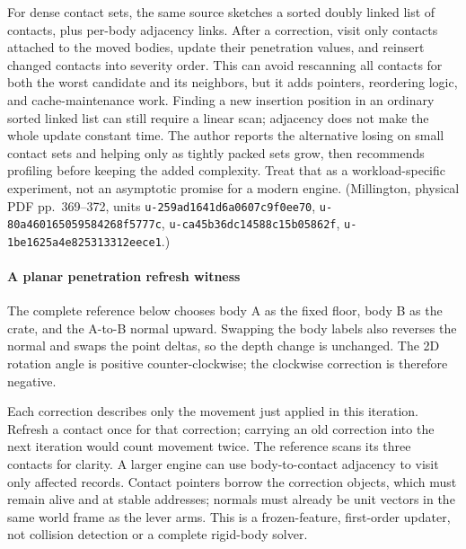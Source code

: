 For dense contact sets, the same source sketches a sorted doubly linked list of contacts, plus per-body adjacency links. After a correction, visit only contacts attached to the moved bodies, update their penetration values, and reinsert changed contacts into severity order. This can avoid rescanning all contacts for both the worst candidate and its neighbors, but it adds pointers, reordering logic, and cache-maintenance work. Finding a new insertion position in an ordinary sorted linked list can still require a linear scan; adjacency does not make the whole update constant time. The author reports the alternative losing on small contact sets and helping only as tightly packed sets grow, then recommends profiling before keeping the added complexity. Treat that as a workload-specific experiment, not an asymptotic promise for a modern engine. (Millington, physical PDF pp.~369--372, units \texttt{u-259ad1641d6a0607c9f0ee70}, \texttt{u-80a460165059584268f5777c}, \texttt{u-ca45b36dc14588c15b05862f}, \texttt{u-1be1625a4e825313312eece1}.)

\paragraph{A planar penetration refresh witness}\label{06-engine-ii-ch046-a-planar-penetration-refresh-witness}

The complete reference below chooses body A as the fixed floor, body B as the crate, and the A-to-B normal upward. Swapping the body labels also reverses the normal and swaps the point deltas, so the depth change is unchanged. The 2D rotation angle is positive counter-clockwise; the clockwise correction is therefore negative.

Each correction describes only the movement just applied in this iteration. Refresh a contact once for that correction; carrying an old correction into the next iteration would count movement twice. The reference scans its three contacts for clarity. A larger engine can use body-to-contact adjacency to visit only affected records. Contact pointers borrow the correction objects, which must remain alive and at stable addresses; normals must already be unit vectors in the same world frame as the lever arms. This is a frozen-feature, first-order updater, not collision detection or a complete rigid-body solver.

